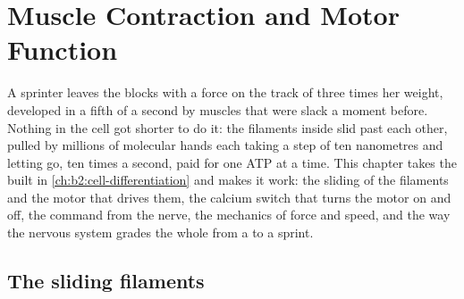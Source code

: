 \chapter{Muscle Contraction and Motor Function}\label{ch:b2:muscle-movement}

A sprinter leaves the blocks with a force on the track of three
times her weight, developed in a fifth of a second by muscles that
were slack a moment before. Nothing in the cell got shorter to do
it: the filaments inside slid past each other, pulled by millions
of molecular hands each taking a step of ten nanometres and letting
go, ten times a second, paid for one ATP at a time. This chapter
takes the  built in \cref{ch:b2:cell-differentiation}
and makes it work: the sliding of the filaments and the motor that
drives them, the calcium switch that turns the motor on and off,
the command from the nerve, the mechanics of force and speed, and
the way the nervous system grades the whole from a  to a
sprint.

\section{The sliding filaments}


